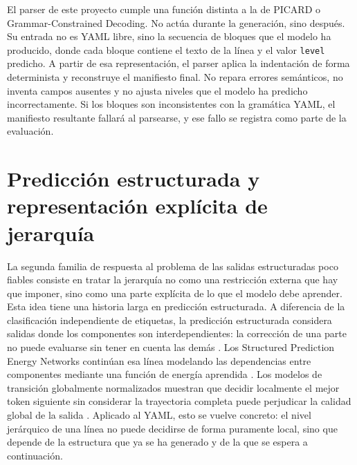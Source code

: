 El parser de este proyecto cumple una función distinta a la de PICARD o Grammar-Constrained Decoding. No actúa durante la generación, sino después. Su entrada no es YAML libre, sino la secuencia de bloques que el modelo ha producido, donde cada bloque contiene el texto de la línea y el valor \texttt{level} predicho. A partir de esa representación, el parser aplica la indentación de forma determinista y reconstruye el manifiesto final. No repara errores semánticos, no inventa campos ausentes y no ajusta niveles que el modelo ha predicho incorrectamente. Si los bloques son inconsistentes con la gramática YAML, el manifiesto resultante fallará al parsearse, y ese fallo se registra como parte de la evaluación.

\section{Predicción estructurada y representación explícita de jerarquía}
\label{sec:estado-arte-prediccion-estructurada}

La segunda familia de respuesta al problema de las salidas estructuradas poco fiables consiste en tratar la jerarquía no como una restricción externa que hay que imponer, sino como una parte explícita de lo que el modelo debe aprender. Esta idea tiene una historia larga en predicción estructurada. A diferencia de la clasificación independiente de etiquetas, la predicción estructurada considera salidas donde los componentes son interdependientes: la corrección de una parte no puede evaluarse sin tener en cuenta las demás \citep{joachims2009structured}. Los Structured Prediction Energy Networks continúan esa línea modelando las dependencias entre componentes mediante una función de energía aprendida \citep{belanger2017spen}. Los modelos de transición globalmente normalizados muestran que decidir localmente el mejor token siguiente sin considerar la trayectoria completa puede perjudicar la calidad global de la salida \citep{andor2016globally}. Aplicado al YAML, esto se vuelve concreto: el nivel jerárquico de una línea no puede decidirse de forma puramente local, sino que depende de la estructura que ya se ha generado y de la que se espera a continuación.

